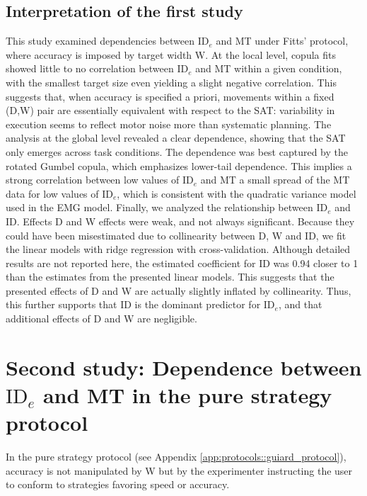 \documentclass[acmlarge, manuscript,review]{acmart}
\newcommand{\ide}{\ensuremath{{\text{ID}_e}}\xspace}
\begin{document}
\subsection{Interpretation of the first study \label{study_one:interpretation}}
This study examined dependencies between \ide and MT under Fitts' protocol, where accuracy is imposed by target width W. At the local level, copula fits showed little to no correlation between \ide and MT within a given condition, with the smallest target size even yielding a slight negative correlation. This suggests that, when accuracy is specified a priori, movements within a fixed (D,W) pair are essentially equivalent with respect to the SAT: variability in execution seems to reflect motor noise more than systematic planning.
The analysis at the global level revealed a clear dependence, showing that the SAT only emerges across task conditions. The dependence was best captured by the rotated Gumbel copula, which emphasizes lower-tail dependence. This implies a strong correlation between low values of \ide and MT \ie a small spread of the MT data for low values of \ide, which is consistent with the quadratic variance model used in the EMG model.
Finally, we analyzed the relationship between \ide and ID. Effects D and W effects were weak, and not always significant. Because they could have been misestimated due to collinearity between D, W and ID, we fit the linear models with ridge regression with cross-validation.%
Although detailed results are not reported here, the estimated coefficient for ID was 0.94 \ie closer to 1 than the estimates from the presented linear models. This suggests that the presented effects of D and W are actually slightly inflated by collinearity. Thus, this further supports that ID is the dominant predictor for \ide, and that additional effects of D and W are negligible.

\section{Second study: Dependence between \ide and MT in the pure strategy protocol \label{sec:gop}}
In the pure strategy protocol (see Appendix \ref{app:protocols::guiard_protocol}), accuracy is not manipulated by W but by the experimenter instructing the user to conform to strategies favoring speed or accuracy.
\end{document}
